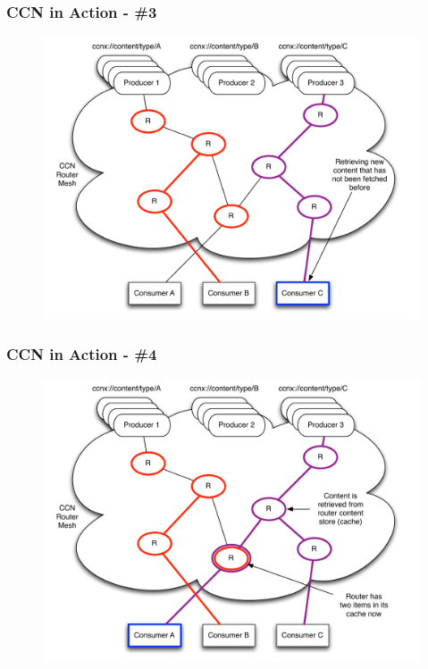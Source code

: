 \documentclass[handout]{beamer}
\begin{document}
\begin{frame}
	\frametitle{CCN in Action - \#3}
	\begin{figure}[h]
		\includegraphics[scale=0.4]{ccn_img3.pdf}
	\end{figure}
\end{frame}

\begin{frame}
	\frametitle{CCN in Action - \#4}
	\begin{figure}[h]
		\includegraphics[scale=0.4]{ccn_img4.pdf}
	\end{figure}
\end{frame}
\end{document}
